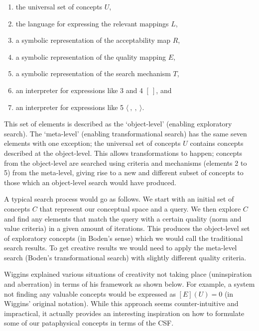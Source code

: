 \begin{enumerate}
	\item the universal set of concepts $U$,
	\item the language for expressing the relevant mappings $L$,
	\item a symbolic representation of the acceptability map $R$,
	\item a symbolic representation of the quality mapping $E$,
  \item a symbolic representation of the search mechanism $T$,
	\item an interpreter for expressions like 3 and 4 $[ \ ]$, and
	\item an interpreter for expressions like 5 $\langle \ , \ , \ \rangle$.
\end{enumerate}

This set of elements is described as the `object-level' (enabling exploratory search). The `meta-level' (enabling transformational search) has the same seven elements with one exception; the universal set of concepts $U$ contains concepts described at the object-level. This allows transformations to happen; concepts from the object-level are searched using criteria and mechanisms (elements 2 to 5) from the meta-level, giving rise to a new and different subset of concepts to those which an object-level search would have produced.

A typical search process would go as follows. We start with an initial set of concepts $C$ that represent our conceptual space and a query. We then explore $C$ and find any elements that match the query with a certain quality (norm and value criteria) in a given amount of iterations. This produces the object-level set of exploratory concepts (in Boden's sense) which we would call the traditional search results. To get creative results we would need to apply the meta-level search (Boden's transformational search) with slightly different quality criteria.

Wiggins explained various situations of creativity not taking place (uninspiration and aberration) in terms of his framework as shown below. For example, a system not finding any valuable concepts would be expressed as $[E](U) = 0$ (in Wiggins' original notation). While this approach seems counter-intuitive and impractical, it actually provides an interesting inspiration on how to formulate some of our pataphysical concepts in terms of the \ac{CSF}.

